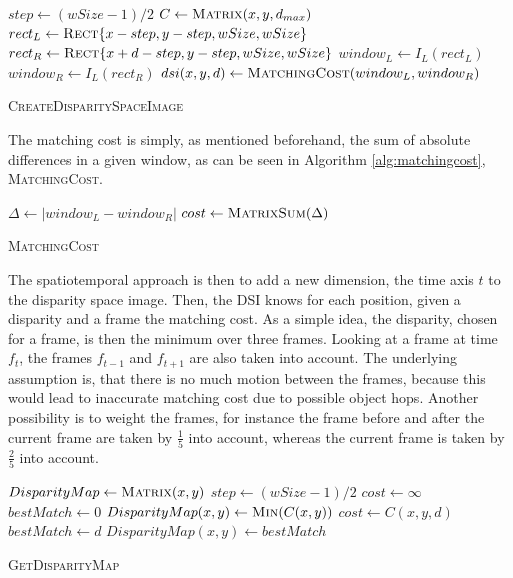 \begin{algorithm}[h!]
\DontPrintSemicolon
{}
$step \gets (wSize - 1) / 2$\;
$C \gets \textsc{Matrix}(x,y,d_{max})$\;
 {
   {
     {
      $rect_{L} \gets \textsc{Rect}\{x - step, y - step, wSize, wSize\}$\;
      $rect_{R} \gets \textsc{Rect}\{x + d - step, y - step, wSize, wSize\}$\;
      $window_{L} \gets I_L(rect_{L})$\;
      $window_{R} \gets I_L(rect_{R})$\;
      $dsi(x,y,d) \gets \textsc{MatchingCost}(window_{L}, window_{R})$\;
    }
  }
}
\;
\caption{\textsc{CreateDisparitySpaceImage}}
\label{alg:dsi-3d}
\end{algorithm}

\noindent The matching cost is simply, as mentioned beforehand, the sum of absolute differences in a given window, as can be seen in Algorithm \ref{alg:matchingcost}, \textsc{MatchingCost}.

\begin{algorithm}[h!]
\DontPrintSemicolon
{}
$\Delta \gets |window_{L} - window_{R}|$\;
$cost \gets \textsc{MatrixSum}(\Delta)$\;
\;
\caption{\textsc{MatchingCost}}
\label{alg:matchingcost}
\end{algorithm}

\noindent The spatiotemporal approach is then to add a new dimension, the time axis $t$ to the disparity space image.
Then, the DSI knows for each position, given a disparity and a frame the matching cost.
As a simple idea, the disparity, chosen for a frame, is then the minimum over three frames.
Looking at a frame at time $f_t$, the frames $f_{t-1}$ and $f_{t+1}$ are also taken into account.
The underlying assumption is, that there is no much motion between the frames, because this would lead to inaccurate matching cost due to possible object hops.
Another possibility is to weight the frames, for instance the frame before and after the current frame are taken by $\frac{1}{5}$ into account, whereas the current frame is taken by $\frac{2}{5}$ into account.

\begin{algorithm}[h!]
\DontPrintSemicolon
{}
$DisparityMap \gets \textsc{Matrix}(x,y)$\;
$step \gets (wSize - 1) / 2$\;
 {
   {
    $cost \gets \infty$\;
    $bestMatch \gets 0$\;
     {
      $DisparityMap(x,y) \gets \textsc{Min}(C(x,y))$\;
       {
        $cost \gets C(x,y,d)$\;
        $bestMatch \gets d$\;
      }
    }
    $DisparityMap(x,y) \gets bestMatch$\;
  }
}
\;
\caption{\textsc{GetDisparityMap}}
\label{alg:disparity-map}
\end{algorithm}

